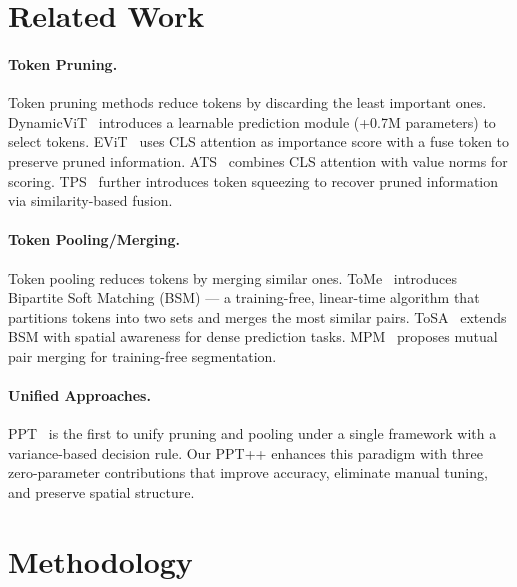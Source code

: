 \documentclass[10pt,twocolumn,letterpaper]{article}
\begin{document}

\section{Related Work}

\paragraph{Token Pruning.}
Token pruning methods reduce tokens by discarding the least important ones.
DynamicViT~\cite{rao2021dynamicvit} introduces a learnable prediction module
(+0.7M parameters) to select tokens. EViT~\cite{liang2022evit} uses CLS
attention as importance score with a fuse token to preserve pruned information.
ATS~\cite{fayyaz2022adaptive} combines CLS attention with value norms for
scoring. TPS~\cite{wei2023tps} further introduces token squeezing to recover
pruned information via similarity-based fusion.

\paragraph{Token Pooling/Merging.}
Token pooling reduces tokens by merging similar ones. ToMe~\cite{bolya2023tome}
introduces Bipartite Soft Matching (BSM) --- a training-free, linear-time
algorithm that partitions tokens into two sets and merges the most similar
pairs. ToSA~\cite{tosa2025} extends BSM with spatial awareness for dense
prediction tasks. MPM~\cite{mpm2025} proposes mutual pair merging for
training-free segmentation.

\paragraph{Unified Approaches.}
PPT~\cite{wu2023ppt} is the first to unify pruning and pooling under a single
framework with a variance-based decision rule. Our PPT++ enhances this paradigm
with three zero-parameter contributions that improve accuracy, eliminate manual
tuning, and preserve spatial structure.



\section{Methodology}
\label{sec:method}
\end{document}
